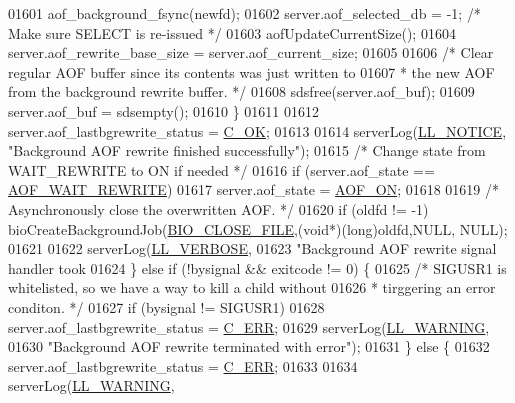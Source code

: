 \begin{DoxyCode}
{{{{{{{{{{{{{{{{{{{{{{{{{{{{{{{{{{01601                 aof\_background\_fsync(newfd);
01602             server.aof\_selected\_db = -1; \textcolor{comment}{/* Make sure SELECT is re-issued */}
01603             aofUpdateCurrentSize();
01604             server.aof\_rewrite\_base\_size = server.aof\_current\_size;
01605 
01606             \textcolor{comment}{/* Clear regular AOF buffer since its contents was just written to}
01607 \textcolor{comment}{             * the new AOF from the background rewrite buffer. */}
01608             sdsfree(server.aof\_buf);
01609             server.aof\_buf = sdsempty();
01610         \}
01611 
01612         server.aof\_lastbgrewrite\_status = \hyperlink{server_8h_a303769ef1065076e68731584e758d3e1}{C\_OK};
01613 
01614         serverLog(\hyperlink{server_8h_a8c54c191e436c7dd3012167212692401}{LL\_NOTICE}, \textcolor{stringliteral}{"Background AOF rewrite finished successfully"});
01615         \textcolor{comment}{/* Change state from WAIT\_REWRITE to ON if needed */}
01616         \textcolor{keywordflow}{if} (server.aof\_state == \hyperlink{server_8h_a7d4b86c89be4d951fbf048130431a16a}{AOF\_WAIT\_REWRITE})
01617             server.aof\_state = \hyperlink{server_8h_af6b151c9dced28e94c19479197113a83}{AOF\_ON};
01618 
01619         \textcolor{comment}{/* Asynchronously close the overwritten AOF. */}
01620         \textcolor{keywordflow}{if} (oldfd != -1) bioCreateBackgroundJob(\hyperlink{bio_8h_ac5890d1af5c5d32376c47ad6b83c2af4}{BIO\_CLOSE\_FILE},(\textcolor{keywordtype}{void}*)(\textcolor{keywordtype}{long})oldfd,NULL,
      NULL);
01621 
01622         serverLog(\hyperlink{server_8h_a479b60032f8da6d8ad72e1a9d0809950}{LL\_VERBOSE},
01623             \textcolor{stringliteral}{"Background AOF rewrite signal handler took %
01624     \} \textcolor{keywordflow}{else} \textcolor{keywordflow}{if} (!bysignal && exitcode != 0) \{
01625         \textcolor{comment}{/* SIGUSR1 is whitelisted, so we have a way to kill a child without}
01626 \textcolor{comment}{         * tirggering an error conditon. */}
01627         \textcolor{keywordflow}{if} (bysignal != SIGUSR1)
01628             server.aof\_lastbgrewrite\_status = \hyperlink{server_8h_af98ac28d5f4d23d7ed5985188e6fb7d1}{C\_ERR};
01629         serverLog(\hyperlink{server_8h_a31229b9334bba7d6be2a72970967a14b}{LL\_WARNING},
01630             \textcolor{stringliteral}{"Background AOF rewrite terminated with error"});
01631     \} \textcolor{keywordflow}{else} \{
01632         server.aof\_lastbgrewrite\_status = \hyperlink{server_8h_af98ac28d5f4d23d7ed5985188e6fb7d1}{C\_ERR};
01633 
01634         serverLog(\hyperlink{server_8h_a31229b9334bba7d6be2a72970967a14b}{LL\_WARNING},
}}}}}}}}}}}}}}}}}}}}}}}}}}}}}}}}}}}
\end{DoxyCode}
